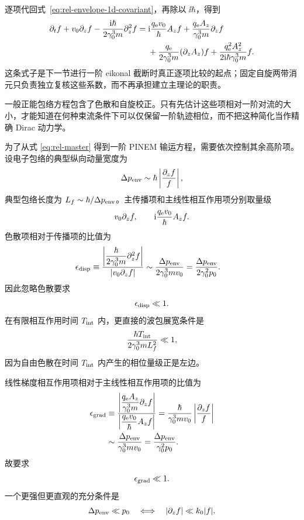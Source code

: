逐项代回式~\cref{eq:rel-envelope-1d-covariant}，再除以 $\ii\hbar$，得到
\begin{equation}
{
\begin{aligned}
\partial_tf+v_0\partial_zf
-\frac{\mathrm{i}\hbar}{2\gamma_0^3m}\partial_z^2f
={}&\mathrm{i}\frac{q_{\rm e}v_0}{\hbar}A_zf
+\frac{q_{\rm e}A_z}{\gamma_0^3m}\partial_zf\\
&+\frac{q_{\rm e}}{2\gamma_0^3m}(\partial_zA_z)f
+\frac{q_{\rm e}^2A_z^2}{2\mathrm{i}\hbar\gamma_0^3m}f.
\end{aligned}}
\label{eq:rel-master}
\end{equation}
这条式子是下一节进行一阶 eikonal 截断时真正逐项比较的起点；固定自旋两带消元只负责独立复核这些系数，而不再承担建立主理论的职责。


一般正能包络方程包含了色散和自旋校正。只有先估计这些项相对一阶对流的大小，才能知道在何种束流条件下可以仅保留一阶轨迹相位，而不把这种简化当作精确 Dirac 动力学。


为了从式 \cref{eq:rel-master} 得到一阶 PINEM 输运方程，需要依次控制其余高阶项。设电子包络的典型纵向动量宽度为
\[
 \Delta p_{\rm env}\sim\hbar\left|\frac{\partial_z f}{f}\right|,
\]
典型包络长度为 $L_f\sim\hbar/\Delta p_{\rm env}$。主传播项和主线性相互作用项分别取量级
\[
 v_0\partial_zf,
 \qquad
 \mathrm{i}\frac{q_{\rm e}v_0}{\hbar}A_zf.
\]
色散项相对于传播项的比值为
\begin{align}
 \epsilon_{\rm disp}
 &\equiv
 \frac{\left|\dfrac{\hbar}{2\gamma_0^3m}\partial_z^2f\right|}
 {\left|v_0\partial_zf\right|}
 \sim\frac{\Delta p_{\rm env}}{2\gamma_0^3mv_0}
 =\frac{\Delta p_{\rm env}}{2\gamma_0^2p_0}.
 \label{eq:eps-disp}
\end{align}
因此忽略色散要求
\begin{equation}
 {\epsilon_{\rm disp}\ll1.}
 \label{eq:disp-condition}
\end{equation}
在有限相互作用时间 $T_{\rm int}$ 内，更直接的波包展宽条件是
\begin{equation}
 {
 \frac{\hbar T_{\rm int}}{2\gamma_0^3mL_f^2}\ll1,}
 \label{eq:disp-time-condition}
\end{equation}
因为自由色散在时间 $T_{\rm int}$ 内产生的相位量级正是左边。

线性梯度相互作用项相对于主线性相互作用项的比值为
\begin{align}
 \epsilon_{\rm grad}
 &\equiv
 \frac{\left|\dfrac{q_{\rm e}A_z}{\gamma_0^3m}\partial_zf\right|}
 {\left|\dfrac{q_{\rm e}v_0}{\hbar}A_zf\right|}
 =\frac{\hbar}{\gamma_0^3mv_0}
 \left|\frac{\partial_zf}{f}\right|\\
 &\sim\frac{\Delta p_{\rm env}}{\gamma_0^3mv_0}
 =\frac{\Delta p_{\rm env}}{\gamma_0^2p_0}.
 \label{eq:eps-grad}
\end{align}
故要求
\begin{equation}
 {\epsilon_{\rm grad}\ll1.}
 \label{eq:grad-condition}
\end{equation}
一个更强但更直观的充分条件是
\begin{equation}
 {\Delta p_{\rm env}\ll p_0
 \quad\Longleftrightarrow\quad
 \left|\partial_zf\right|\ll k_0|f|.}
 \label{eq:slow-envelope-condition}
\end{equation}

